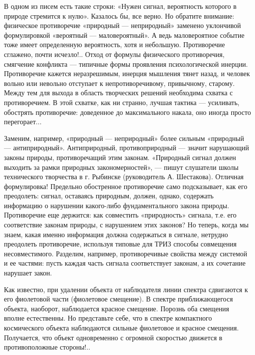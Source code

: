 В  одном  из  писем  есть такие  строки:  «Нужен  сигнал,  вероятность
которого  в природе  стремится к  нулю».  Казалось бы,  все верно.  Но
обратите внимание:  физическое противоречие «природный  — неприродный»
заменено  уклончивой  формулировкой  «вероятный  —  маловероятный».  А
ведь  маловероятное  событие   тоже  имеет  определенную  вероятность,
хотя  и небольшую.  Противоречие сглажено,  почти исчезло!..  Отход от
формулы физического противоречия, смягчение конфликта — типичные формы
проявления психологической инерции. Противоречие кажется неразрешимым,
инерция мышления тянет назад, и  человек вольно или невольно отступает
к  непротиворечивому,  привычному, старому.  Между  тем  для выхода  в
область творческих решений необходима  схватка с противоречием. В этой
схватке,  как  ни  странно,  лучшая  тактика  —  усиливать,  обострять
противоречие: доведенное  до максимального  накала, оно  иногда просто
перегорает...

Заменим, например, «природный —  неприродный» более сильным «природный
— антиприродный». Антиприродный,  противоприродный — значит нарушающий
законы природы, противоречащий этим  законам. «Природный сигнал должен
выходить  за  рамки  природных  закономерностей»,  —  пишут  слушатели
школы  технического   творчества  в   г.  Рыбинске   (руководитель  А.
Шестакова). Отличная формулировка!  Предельно обостренное противоречие
само подсказывает,  как его  преодолеть: сигнал,  оставаясь природным,
должен,   однако,  содержать   информацию   о  нарушении   какого-либо
фундаментального  закона  природы.   Противоречие  еще  держится:  как
совместить  «природность»  сигнала,   т.е.  его  соответствие  законам
природы,  с  нарушением  этих  законов? Но  теперь,  когда  мы  знаем,
какая  именно  информация  должна   содержаться  в  сигнале,  нетрудно
преодолеть противоречие, используя типовые для ТРИЗ способы совмещения
несовместимого.  Разделим,  например,  противоречивые  свойства  между
системой  и  ее  частями:  пусть каждая  часть  сигнала  соответствует
законам, а их сочетание нарушает закон.

Как  известно,  при  удалении  объекта от  наблюдателя  линии  спектра
сдвигаются  к его  фиолетовой части  (фиолетовое смещение).  В спектре
приближающегося  объекта,  наоборот,   наблюдается  красное  смещение.
Порознь  оба смещения  вполне  естественны. Но  представьте себе,  что
в  спектре   компактного  космического  объекта   наблюдаются  сильные
фиолетовое и  красное смещения. Получается, что  объект одновременно с
огромной скоростью движется в противоположные стороны!..

